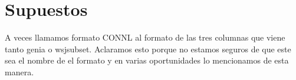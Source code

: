 \section{Supuestos}

A veces llamamos formato CONNL al formato de las tres columnas que viene tanto genia o wsjsubset. Aclaramos esto porque no estamos seguros de que este sea el nombre de el formato y en varias oportunidades lo mencionamos de esta manera.
